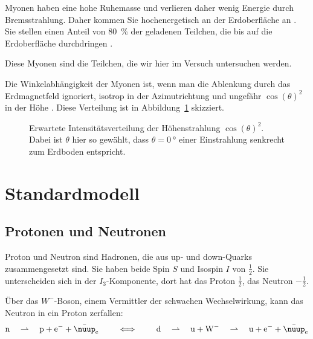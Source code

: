 \documentclass[11pt, ngerman, fleqn, DIV=15, headinclude, BCOR=2cm]{scrreprt}
\begin{document}
Myonen haben eine hohe Ruhemasse und verlieren
daher wenig Energie durch Bremsstrahlung. Daher kommen Sie hochenergetisch an
der Erdoberfläche an \parencite[984]{meschede-gerthsen_24}. Sie stellen einen
Anteil von \SI{80}{\percent} der geladenen Teilchen, die bis auf die
Erdoberfläche durchdringen \parencite[111]{Grupen/Astroteilchenphysik}.

Diese Myonen sind die Teilchen, die wir hier im Versuch untersuchen werden.

Die Winkelabhängigkeit der Myonen ist, wenn man die Ablenkung durch das
Erdmagnetfeld ignoriert, isotrop in der Azimutrichtung und ungefähr
$\cos(\theta)^2$ in der Höhe \parencite[(7.2)]{Grupen/Astroteilchenphysik}.
Diese Verteilung ist in Abbildung~\ref{fig:cos2} skizziert.

\begin{figure}[htbp]
    \centering
    \caption{%
        Erwartete Intensitätsverteilung der Höhenstrahlung $\cos(\theta)^2$.
        Dabei ist $\theta$ hier so gewählt, dass $\theta = \SI{0}{\degree}$
        einer Einstrahlung senkrecht zum Erdboden entspricht.
    }
    \label{fig:cos2}
\end{figure}

\section{Standardmodell}

\subsection{Protonen und Neutronen}

Proton und Neutron sind Hadronen, die aus up- und down-Quarks zusammengesetzt
sind. Sie haben beide Spin $S$ und Isospin $I$ von $\frac12$. Sie unterscheiden
sich in der $I_3$-Komponente, dort hat das Proton $\frac12$, das Neutron
$-\frac12$.

Über das $W^-$-Boson, einem Vermittler der schwachen Wechselwirkung, kann das
Neutron in ein Proton zerfallen:
\[
    \mathrm n \quad\rightharpoonup\quad \mathrm p + \mathrm e^- + \bar
    \nuup_\mathrm e
    \qquad\iff\qquad
    \mathrm d
    \quad\rightharpoonup\quad
    \mathrm u + \mathrm W^-
    \quad\rightharpoonup\quad
    \mathrm u
    + \mathrm e^- + \bar \nuup_\mathrm e
\]
\end{document}
